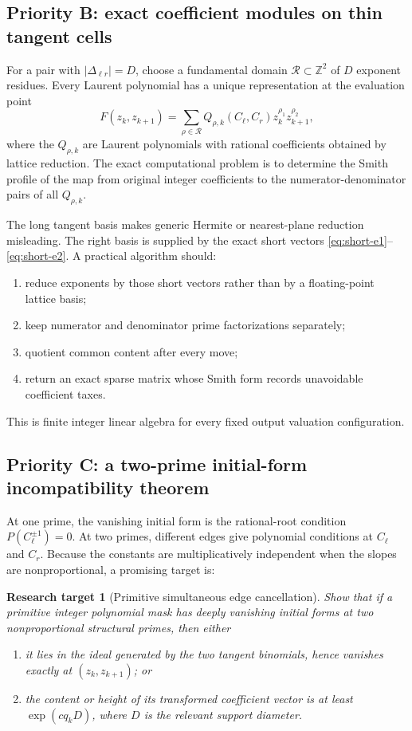 \documentclass[11pt,oneside]{article}
\newtheorem{target}[theorem]{Research target}
\theoremstyle{definition}
\theoremstyle{remark}
\newcommand{\Z}{\mathbb Z}
\begin{document}
\subsection{Priority B: exact coefficient modules on thin tangent cells}

For a pair with $|\Delta_{\ell r}|=D$, choose a fundamental domain
$\mathcal R\subset\Z^2$ of $D$ exponent residues.  Every Laurent polynomial has a unique
representation at the evaluation point
\begin{equation}
 F(z_k,z_{k+1})
 =\sum_{\rho\in\mathcal R}Q_{\rho,k}(C_\ell,C_r)
   z_k^{\rho_1}z_{k+1}^{\rho_2},
 \label{eq:simultaneous-normal}
\end{equation}
where the $Q_{\rho,k}$ are Laurent polynomials with rational coefficients obtained by lattice
reduction.  The exact computational problem is to determine the Smith profile of the map
from original integer coefficients to the numerator-denominator pairs of all
$Q_{\rho,k}$.

The long tangent basis makes generic Hermite or nearest-plane reduction misleading.  The
right basis is supplied by the exact short vectors \eqref{eq:short-e1}--\eqref{eq:short-e2}.
A practical algorithm should:
\begin{enumerate}
\item reduce exponents by those short vectors rather than by a floating-point lattice basis;
\item keep numerator and denominator prime factorizations separately;
\item quotient common content after every move;
\item return an exact sparse matrix whose Smith form records unavoidable coefficient taxes.
\end{enumerate}

This is finite integer linear algebra for every fixed output valuation configuration.

\subsection{Priority C: a two-prime initial-form incompatibility theorem}

At one prime, the vanishing initial form is the rational-root condition
$P(C_\ell^{\pm1})=0$.  At two primes, different edges give polynomial conditions at
$C_\ell$ and $C_r$.  Because the constants are multiplicatively independent when the slopes
are nonproportional, a promising target is:

\begin{target}[Primitive simultaneous edge cancellation]
\label{target:edge-incompatibility}
Show that if a primitive integer polynomial mask has deeply vanishing initial forms at two
nonproportional structural primes, then either
\begin{enumerate}
\item it lies in the ideal generated by the two tangent binomials, hence vanishes exactly at
$(z_k,z_{k+1})$; or
\item the content or height of its transformed coefficient vector is at least
$\exp(cq_kD)$, where $D$ is the relevant support diameter.
\end{enumerate}
\end{target}
\end{document}
